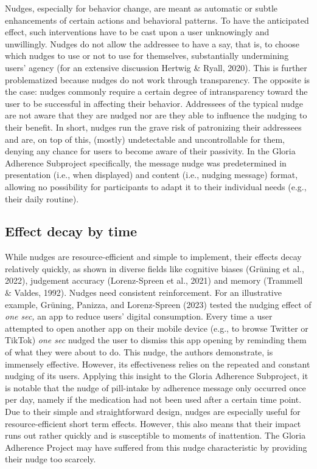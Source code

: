 \documentclass[reflection, authordate,issue]{jote-new-article}
\begin{document}
Nudges, especially for behavior change, are meant as automatic or subtle enhancements of certain actions and behavioral patterns. To have the anticipated effect, such interventions have to be cast upon a user unknowingly and unwillingly. Nudges do not allow the addressee to have a say, that is, to choose which nudges to use or not to use for themselves, substantially undermining users’ agency (for an extensive discussion Hertwig \& Ryall, 2020). This is further problematized because nudges do not work through transparency. The opposite is the case: nudges commonly require a certain degree of intransparency toward the user to be successful in affecting their behavior. Addressees of the typical nudge are not aware that they are nudged nor are they able to influence the nudging to their benefit. In short, nudges run the grave risk of patronizing their addressees and are, on top of this, (mostly) undetectable and uncontrollable for them, denying any chance for users to become aware of their passivity. In the Gloria Adherence Subproject specifically, the message nudge was predetermined in presentation (i.e., when displayed) and content (i.e., nudging message) format, allowing no possibility for participants to adapt it to their individual needs (e.g., their daily routine).



\subsection{Effect decay by time}



While nudges are resource-efficient and simple to implement, their effects decay relatively quickly, as shown in diverse fields like cognitive biases (Grüning et al., 2022), judgement accuracy (Lorenz-Spreen et al., 2021) and memory (Trammell \& Valdes, 1992). Nudges need consistent reinforcement. For an illustrative example, Grüning, Panizza, and Lorenz-Spreen (2023) tested the nudging effect of \emph{one sec,} an app to reduce users’ digital consumption. Every time a user attempted to open another app on their mobile device (e.g., to browse Twitter or TikTok) \emph{one sec} nudged the user to dismiss this app opening by reminding them of what they were about to do. This nudge, the authors demonstrate, is immensely effective. However, its effectiveness relies on the repeated and constant nudging of its users. Applying this insight to the Gloria Adherence Subproject, it is notable that the nudge of pill-intake by adherence message only occurred once per day, namely if the medication had not been used after a certain time point. Due to their simple and straightforward design, nudges are especially useful for resource-efficient short term effects. However, this also means that their impact runs out rather quickly and is susceptible to moments of inattention. The Gloria Adherence Project may have suffered from this nudge characteristic by providing their nudge too scarcely.
\end{document}
